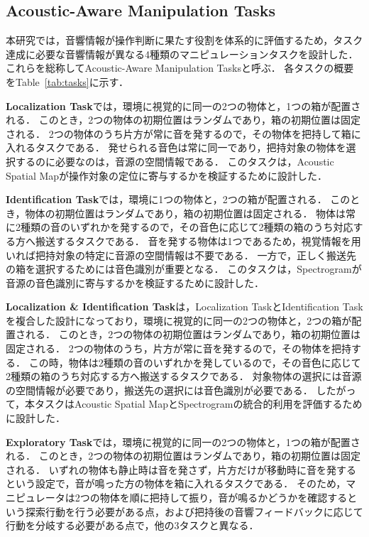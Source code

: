 \documentclass{article}
\begin{document}
\subsection{Acoustic-Aware Manipulation Tasks}
\label{sec:tasks}
	本研究では，音響情報が操作判断に果たす役割を体系的に評価するため，タスク達成に必要な音響情報が異なる4種類のマニピュレーションタスクを設計した．
	これらを総称してAcoustic-Aware Manipulation Tasksと呼ぶ．
	各タスクの概要をTable~\ref{tab:tasks}に示す．

	\textbf{Localization Task}では，環境に視覚的に同一の2つの物体と，1つの箱が配置される．
	このとき，2つの物体の初期位置はランダムであり，箱の初期位置は固定される．
	2つの物体のうち片方が常に音を発するので，その物体を把持して箱に入れるタスクである．
	発せられる音色は常に同一であり，把持対象の物体を選択するのに必要なのは，音源の空間情報である．
	このタスクは，Acoustic Spatial Mapが操作対象の定位に寄与するかを検証するために設計した．

	\textbf{Identification Task}では，環境に1つの物体と，2つの箱が配置される．
	このとき，物体の初期位置はランダムであり，箱の初期位置は固定される．
	物体は常に2種類の音のいずれかを発するので，その音色に応じて2種類の箱のうち対応する方へ搬送するタスクである．
	音を発する物体は1つであるため，視覚情報を用いれば把持対象の特定に音源の空間情報は不要である．
	一方で，正しく搬送先の箱を選択するためには音色識別が重要となる．
	このタスクは，Spectrogramが音源の音色識別に寄与するかを検証するために設計した．

	\textbf{Localization \& Identification Task}は，Localization TaskとIdentification Taskを複合した設計になっており，環境に視覚的に同一の2つの物体と，2つの箱が配置される．
	このとき，2つの物体の初期位置はランダムであり，箱の初期位置は固定される．
	2つの物体のうち，片方が常に音を発するので，その物体を把持する．
	この時，物体は2種類の音のいずれかを発しているので，その音色に応じて2種類の箱のうち対応する方へ搬送するタスクである．
	対象物体の選択には音源の空間情報が必要であり，搬送先の選択には音色識別が必要である．
	したがって，本タスクはAcoustic Spatial MapとSpectrogramの統合的利用を評価するために設計した．

	\textbf{Exploratory Task}では，環境に視覚的に同一の2つの物体と，1つの箱が配置される．
	このとき，2つの物体の初期位置はランダムであり，箱の初期位置は固定される．
	いずれの物体も静止時は音を発さず，片方だけが移動時に音を発するという設定で，音が鳴った方の物体を箱に入れるタスクである．
	そのため，マニピュレータは2つの物体を順に把持して振り，音が鳴るかどうかを確認するという探索行動を行う必要がある点，および把持後の音響フィードバックに応じて行動を分岐する必要がある点で，他の3タスクと異なる．
\end{document}
